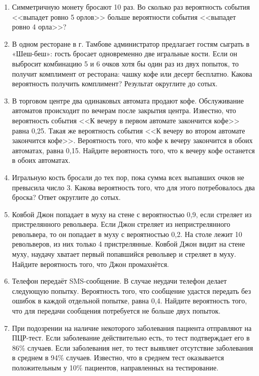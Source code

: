 \documentclass[12pt]{article}
\begin{document}
    \begin{enumerate}[start=1,label={\itshape\bfseries \arabic*.}]
        \item Симметричную монету бросают 10 раз. Во сколько раз вероятность события <<выпадет ровно 5 орлов>> больше вероятности события <<выпадет ровно 4 орла>>?
        \item В одном ресторане в г. Тамбове администратор предлагает гостям сыграть в «Шеш-беш»: гость бросает одновременно две игральные кости. Если он выбросит комбинацию 5 и 6 очков хотя бы один раз из двух попыток, то получит комплимент от ресторана: чашку кофе или десерт бесплатно. Какова вероятность получить комплимент? Результат округлите до сотых.
        \item  В торговом центре два одинаковых автомата продают кофе. Обслуживание автоматов происходит по вечерам после закрытия центра. Известно, что вероятность события <<К вечеру в первом автомате закончится кофе>> равна 0,25. Такая же вероятность события <<К вечеру во втором автомате закончится кофе>>. Вероятность того, что кофе к вечеру закончится в обоих автоматах, равна 0,15. Найдите вероятность того, что к вечеру кофе останется в обоих автоматах.
        \item Игральную кость бросали до тех пор, пока сумма всех выпавших очков не превысила число 3. Какова вероятность того, что для этого потребовалось два броска? Ответ округлите до сотых.
        \item Ковбой Джон попадает в муху на стене с вероятностью 0,9, если стреляет из пристрелянного револьвера. Если Джон стреляет из непристрелянного револьвера, то он попадает в муху с вероятностью 0,2. На столе лежит 10 револьверов, из них только 4 пристрелянные. Ковбой Джон видит на стене муху, наудачу хватает первый попавшийся револьвер и стреляет в муху. Найдите вероятность того, что Джон промахнётся.
        \item Телефон передаёт SMS-сообщение. В случае неудачи телефон делает следующую попытку. Вероятность того, что сообщение удастся передать без ошибок в каждой отдельной попытке, равна 0,4. Найдите вероятность того, что для передачи сообщения потребуется не больше двух попыток.
        \item При подозрении на наличие некоторого заболевания пациента отправляют на ПЦР-тест. Если заболевание действительно есть, то тест подтверждает его в 86\% случаев. Если заболевания нет, то тест выявляет отсутствие заболевания в среднем в 94\% случаев. Известно, что в среднем тест оказывается положительным у 10\% пациентов, направленных на тестирование.

\end{enumerate}
\end{document}
